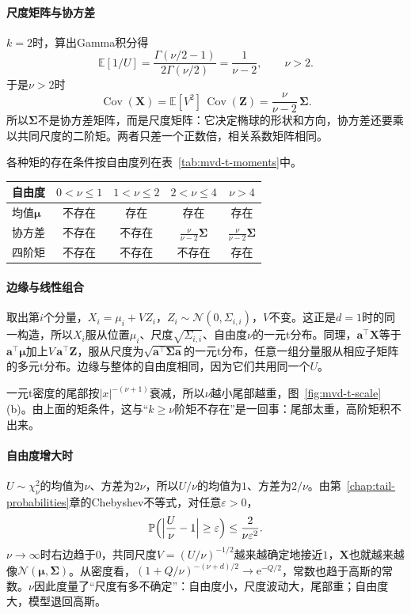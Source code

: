 \paragraph{尺度矩阵与协方差}
$k=2$时，算出Gamma积分得
\[
 \mathbb{E}[1/U]=\frac{\Gamma(\nu/2-1)}{2\Gamma(\nu/2)}=\frac{1}{\nu-2},\qquad \nu>2 .
\]
于是$\nu>2$时
\begin{equation}
 \operatorname{Cov}(\bm{X})=\mathbb{E}[V^{2}]\,\operatorname{Cov}(\bm{Z})=\frac{\nu}{\nu-2}\,\bm{\Sigma} .
 \label{eq:mvd-t-cov}
\end{equation}
所以$\bm{\Sigma}$不是协方差矩阵，而是尺度矩阵：它决定椭球的形状和方向，协方差还要乘以共同尺度的二阶矩。两者只差一个正数倍，相关系数矩阵相同。

各种矩的存在条件按自由度列在表~\ref{tab:mvd-t-moments}中。

\begin{BookInlineTable}
  \centering
  \begin{tabular}{lcccc}
    \toprule
    自由度 & $0<\nu\leq1$ & $1<\nu\leq2$ & $2<\nu\leq4$ & $\nu>4$\\
    \midrule
    均值$\bm{\mu}$ & 不存在 & 存在 & 存在 & 存在\\
    协方差 & 不存在 & 不存在 & $\frac{\nu}{\nu-2}\bm{\Sigma}$ & $\frac{\nu}{\nu-2}\bm{\Sigma}$\\
    四阶矩 & 不存在 & 不存在 & 不存在 & 存在\\
    \bottomrule
  \end{tabular}
  \caption{多元t分布各阶矩的存在条件，“存在”指对应的期望有限。}
  \label{tab:mvd-t-moments}
\end{BookInlineTable}

\paragraph{边缘与线性组合}
取出第$i$个分量，$X_i=\mu_i+VZ_i$，$Z_i\sim\mathcal{N}(0,\Sigma_{i,i})$，$V$不变。这正是$d=1$时的同一构造，所以$X_i$服从位置$\mu_i$、尺度$\sqrt{\Sigma_{i,i}}$、自由度$\nu$的一元t分布。同理，$\bm{a}^{\top}\bm{X}$等于$\bm{a}^{\top}\bm{\mu}$加上$V\,\bm{a}^{\top}\bm{Z}$，服从尺度为$\sqrt{\bm{a}^{\top}\bm{\Sigma}\bm{a}}$的一元t分布，任意一组分量服从相应子矩阵的多元t分布。边缘与整体的自由度相同，因为它们共用同一个$U$。

一元t密度的尾部按$\lvert x\rvert^{-(\nu+1)}$衰减，所以$\nu$越小尾部越重，图~\ref{fig:mvd-t-scale}(b)。由上面的矩条件，这与“$k\geq\nu$阶矩不存在”是一回事：尾部太重，高阶矩积不出来。

\paragraph{自由度增大时}
$U\sim\chi^2_\nu$的均值为$\nu$、方差为$2\nu$，所以$U/\nu$的均值为$1$、方差为$2/\nu$。由第~\ref{chap:tail-probabilities}章的Chebyshev不等式，对任意$\varepsilon>0$，
\[
 \mathbb{P}\Bigl(\Bigl\lvert\frac{U}{\nu}-1\Bigr\rvert\geq\varepsilon\Bigr)\leq\frac{2}{\nu\varepsilon^{2}} .
\]
$\nu\to\infty$时右边趋于$0$，共同尺度$V=(U/\nu)^{-1/2}$越来越确定地接近$1$，$\bm{X}$也就越来越像$\mathcal{N}(\bm{\mu},\bm{\Sigma})$。从密度看，$(1+Q/\nu)^{-(\nu+d)/2}\to\mathrm{e}^{-Q/2}$，常数也趋于高斯的常数。$\nu$因此度量了“尺度有多不确定”：自由度小，尺度波动大，尾部重；自由度大，模型退回高斯。

